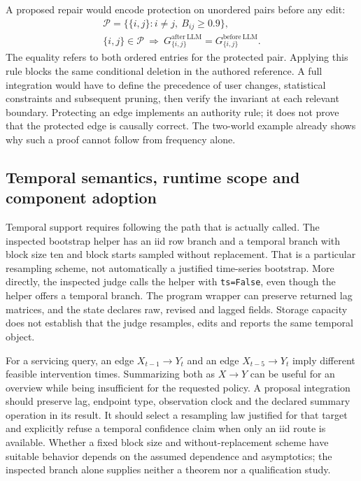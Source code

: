 A proposed repair would encode protection on unordered pairs before any edit:
\begin{equation}
 \begin{gathered}
 \mathcal P=\{\{i,j\}:i\ne j,\ B_{ij}\ge0.9\},\\
 \{i,j\}\in\mathcal P\ \Longrightarrow\
 G^{\mathrm{after\ LLM}}_{\{i,j\}}=G^{\mathrm{before\ LLM}}_{\{i,j\}}.
 \end{gathered}
 \label{exec17:copilot-guard}
\end{equation}
The equality refers to both ordered entries for the protected pair. Applying
this rule blocks the same conditional deletion in the authored reference.
A full integration would have to define the precedence of user changes,
statistical constraints and subsequent pruning, then verify the invariant at
each relevant boundary. Protecting an edge implements an authority rule; it
does not prove that the protected edge is causally correct. The two-world
example already shows why such a proof cannot follow from frequency alone.
\citep{exec17_copilot_exact}

\subsection{Temporal semantics, runtime scope and component adoption}

Temporal support requires following the path that is actually called. The
inspected bootstrap helper has an iid row branch and a temporal branch with
block size ten and block starts sampled without replacement. That is a
particular resampling scheme, not automatically a justified time-series
bootstrap. More directly, the inspected judge calls the helper with
\texttt{ts=False}, even though the helper offers a temporal branch. The
program wrapper can preserve returned lag matrices, and the state declares
raw, revised and lagged fields. Storage capacity does not establish that the
judge resamples, edits and reports the same temporal object.
\citep{exec17_copilot_code}

For a servicing query, an edge $X_{t-1}\to Y_t$ and an edge
$X_{t-5}\to Y_t$ imply different feasible intervention times. Summarizing
both as $X\to Y$ can be useful for an overview while being insufficient for
the requested policy. A proposal integration should preserve lag, endpoint
type, observation clock and the declared summary operation in its result.
It should select a resampling law justified for that target and explicitly
refuse a temporal confidence claim when only an iid route is available.
Whether a fixed block size and without-replacement scheme have suitable
behavior depends on the assumed dependence and asymptotics; the inspected
branch alone supplies neither a theorem nor a qualification study.

